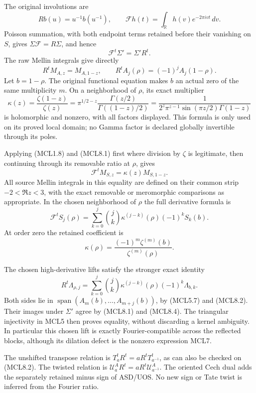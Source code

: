 The original involutions are \[
 Rb(u)=u^{-1}b(u^{-1}),\qquad
 \mathcal Fh(t)=\int_{\mathbb R}h(v)e^{-2\pi ivt}\,dv .
\] Poisson summation, with both endpoint terms retained before their
vanishing on \(S\), gives \(\Sigma\mathcal F=R\Sigma\), and hence \[
 \mathcal F^t\Sigma'=\Sigma'R^t.
 \tag{MCL8.1}
\] The raw Mellin integrals give directly \[
 R^tM_{A,z}=M_{A,1-z},\qquad
 R^t A_j(\rho)=(-1)^jA_j(1-\rho).
 \tag{MCL8.2}
\] Let \(b=1-\rho\). The original functional equation makes \(b\) an
actual zero of the same multiplicity \(m\). On a neighborhood of
\(\rho\), its exact multiplier \[
 \kappa(z)=\frac{\zeta(1-z)}{\zeta(z)}
 =\pi^{1/2-z}\frac{\Gamma(z/2)}{\Gamma((1-z)/2)}
 =\frac1{2^z\pi^{z-1}\sin(\pi z/2)\Gamma(1-z)}
 \tag{MCL8.3}
\] is holomorphic and nonzero, with all factors displayed. This formula
is only used on its proved local domain; no Gamma factor is declared
globally invertible through its poles.

Applying (MCL1.8) and (MCL8.1) first where division by \(\zeta\) is
legitimate, then continuing through its removable ratio at \(\rho\),
gives \[
 \mathcal F^tM_{S,z}=\kappa(z)M_{S,1-z}.
\] All source Mellin integrals in this equality are defined on their
common strip \(-2<\Re z<3\), with the exact removable or meromorphic
comparisons as appropriate. In the chosen neighborhood of \(\rho\) the
full derivative formula is \[
 \boxed{
 \mathcal F^t S_j(\rho)
 =\sum_{k=0}^j\binom jk\kappa^{(j-k)}(\rho)
            (-1)^k S_k(b).
 }
 \tag{MCL8.4}
\] At order zero the retained coefficient is \[
 \kappa(\rho)=
 \frac{(-1)^m\zeta^{(m)}(b)}{\zeta^{(m)}(\rho)}.
 \tag{MCL8.5}
\]

The chosen high-derivative lifts satisfy the stronger exact identity \[
 \boxed{
 R^t\Lambda_{\rho,j}
 =\sum_{k=0}^j\binom jk\kappa^{(j-k)}(\rho)
            (-1)^k\Lambda_{b,k}.
 }
 \tag{MCL8.6}
\] Both sides lie in \(\operatorname{span}(A_m(b),\ldots,A_{m+j}(b))\),
by (MCL5.7) and (MCL8.2). Their images under \(\Sigma'\) agree by
(MCL8.1) and (MCL8.4). The triangular injectivity in MCL5 then proves
equality, without discarding a kernel ambiguity. In particular this
chosen lift is exactly Fourier-compatible across the reflected blocks,
although its dilation defect is the nonzero expression MCL7.

The unshifted transpose relation is \(T_a^tR^t=aR^tT_{a^{-1}}^t\), as
can also be checked on (MCL8.2). The twisted relation is
\(\mathcal U_a^AR^t=aR^t\mathcal U_{a^{-1}}^A\). The oriented Cech dual
adds the separately retained minus sign of ASD/UOS. No new sign or Tate
twist is inferred from the Fourier ratio.

